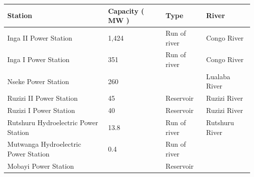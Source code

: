 \documentclass{article}
\begin{document}
\begin{tabular}{llll}
\toprule
Station & Capacity ( MW ) & Type & River \\
\midrule
Inga II Power Station & 1,424 & Run of river & Congo River \\
Inga I Power Station & 351 & Run of river & Congo River \\
Nseke Power Station & 260 &  & Lualaba River \\
Ruzizi II Power Station & 45 & Reservoir & Ruzizi River \\
Ruzizi I Power Station & 40 & Reservoir & Ruzizi River \\
Rutshuru Hydroelectric Power Station & 13.8 & Run of river & Rutshuru River \\
Mutwanga Hydroelectric Power Station & 0.4 & Run of river &  \\
Mobayi Power Station &  & Reservoir &  \\
\bottomrule
\end{tabular}
\end{document}
